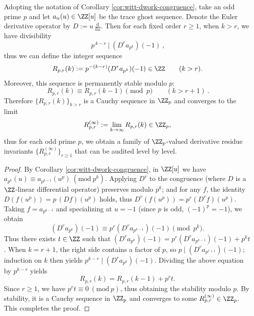 \begin{corollary}[\texorpdfstring{$p$}{p}-adic derivative residues at \texorpdfstring{$u=-1$}{u=-1}: \texorpdfstring{$\ZZ_p$}{Zp}-valued fingerprint family induced by Dwork congruence]\label{cor:witt-minus1-padic-derivative-residues}
Adopting the notation of Corollary \ref{cor:witt-dwork-congruence}, take an odd prime \(p\) and let \(a_n(u)\in\ZZ[u]\) be the trace ghost sequence.
Denote the Euler derivative operator by \(D:=u\,\frac{\mathrm{d}}{\mathrm{d}u}\).
Then for each fixed order \(r\ge 1\), when \(k>r\), we have divisibility
\[
\boxed{\ p^{\,k-r}\ \big|\ (D^r a_{p^k})(-1)\ },
\]
thus we can define the integer sequence
\[
R_{p,r}(k):=p^{-(k-r)}(D^r a_{p^k})(-1)\in\ZZ\qquad(k>r).
\]
Moreover, this sequence is permanently stable modulo \(p\):
\[
\boxed{\ R_{p,r}(k)\equiv R_{p,r}(k-1)\pmod p\qquad(k>r+1)\ }.
\]
Therefore \(\{R_{p,r}(k)\}_{k>r}\) is a Cauchy sequence in \(\ZZ_p\) and converges to the limit
\[
R_{p,r}^{(\infty)}:=\lim_{k\to\infty}R_{p,r}(k)\in\ZZ_p,
\]
thus for each odd prime \(p\), we obtain a family of \(\ZZ_p\)-valued derivative residue invariants \(\{R_{p,r}^{(\infty)}\}_{r\ge 1}\) that can be audited level by level.
\end{corollary}
\begin{proof}
By Corollary \ref{cor:witt-dwork-congruence}, in \(\ZZ[u]\) we have
\(
a_{p^k}(u)\equiv a_{p^{k-1}}(u^p)\ (\mathrm{mod}\ p^k)
\).
Applying \(D^r\) to the congruence (where \(D\) is a \(\ZZ\)-linear differential operator) preserves modulo \(p^k\); and for any \(f\), the identity
\(
D(f(u^p))=p\,(Df)(u^p)
\)
holds, thus \(D^r(f(u^p))=p^r(D^rf)(u^p)\).
Taking \(f=a_{p^{k-1}}\) and specializing at \(u=-1\) (since \(p\) is odd, \((-1)^p=-1\)), we obtain
\[
(D^ra_{p^k})(-1)\equiv p^r(D^ra_{p^{k-1}})(-1)\pmod{p^k}.
\]
Thus there exists \(t\in\ZZ\) such that
\(
(D^ra_{p^k})(-1)=p^r(D^ra_{p^{k-1}})(-1)+p^k t
\).
When \(k=r+1\), the right side contains a factor of \(p\), so \(p\mid (D^ra_{p^{r+1}})(-1)\); induction on \(k\) then yields \(p^{k-r}\mid (D^ra_{p^k})(-1)\).
Dividing the above equation by \(p^{k-r}\) yields
\[
R_{p,r}(k)=R_{p,r}(k-1)+p^r t.
\]
Since \(r\ge 1\), we have \(p^r t\equiv 0\ (\mathrm{mod}\ p)\), thus obtaining the stability modulo \(p\). By stability, it is a Cauchy sequence in \(\ZZ_p\) and converges to some \(R_{p,r}^{(\infty)}\in\ZZ_p\). This completes the proof.
\end{proof}
